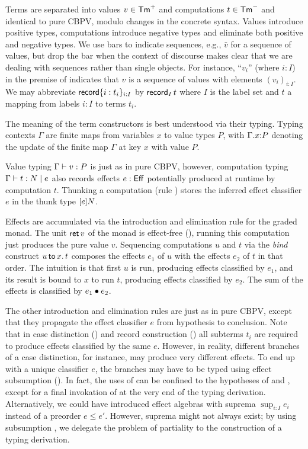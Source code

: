 \documentclass[acmsmall,review,anonymous]{acmart}\settopmatter{printfolios=true,printccs=false,printacmref=false}
\begin{document}
Terms are separated into values $v \in \PTm$ and computations $t \in
\NTm$ and identical to pure CBPV, modulo changes in the concrete
syntax.  Values introduce positive types,
computations introduce
negative types and
eliminate both positive and negative types.
We use bars to indicate sequences, e.g., $\bar v$ for a
sequence of values, but drop the bar when the context of discourse
makes clear that we are dealing with sequences rather than single
objects.  For instance, ``$v_i$'' (where $i : I$) in the premise of
\rintro\otimes indicates that $v$ is a sequence of values with
elements $(v_i)_{i:I}$.  We may abbreviate $\trecord \{i :
t_i\}_{i:I}$ by $\recrd I t$ where $I$ is the label set and $t$ a
mapping from labels $i:I$ to terms $t_i$.

The meaning of the term constructors is best understood via their
typing.  Typing contexts $\Gamma$ are finite maps from variables $x$
to value types $P$, with $\ext \Gamma x P$ denoting the update of the
finite map $\Gamma$ at key $x$ with value $P$.

Value typing $\ValTy \Gamma v P$ is just as in pure CBPV, however,
computation typing $\CompTy \Gamma t e N$ also records effects $e :
\Eff$ potentially produced at runtime by computation $t$.  Thunking a
computation (rule \rintro\Box) stores the inferred effect classifier
$e$ in the thunk type $\thunkty e N$.

Effects are accumulated via the introduction and elimination rule for
the graded monad.  The unit $\ret v$ of the monad is effect-free
(\rintro\diamond), running this computation just produces the pure
value $v$.  Sequencing computations $u$ and $t$ via the \emph{bind}
construct $\bind x u t$ composes the effects $e_1$ of $u$ with the
effects $e_2$ of $t$ in that order.  The intuition is that first $u$
is run, producing effects classified by $e_1$, and its result is bound
to $x$ to run $t$, producing effects classified by $e_2$.  The sum of
the effects is classified by $e_1 \bu e_2$.

The other introduction and elimination rules are just as in pure
CBPV, except that they propagate the effect classifier $e$ from
hypothesis to conclusion.  Note that in case distinction (\relim\GS)
and record construction (\rintro\Pi) all subterms $t_i$ are required
to produce effects classified by the same $e$.  However, in reality,
different branches of a case distinction, for instance, may produce
very different effects.  To end up with a unique classifier $e$, the
branches may have to be typed using effect subsumption (\rsub).  In
fact, the uses of \rsub can be confined to the hypotheses of \relim\GS
and \rintro\Pi, except for a final invokation of \rsub at the very end
of the typing derivation.  Alternatively, we could have introduced
effect algebras with suprema $\sup_{i:I} e_i$ instead of a preorder $e
\leq e'$.  However, suprema might not always exist; by using
subsumption \rsub, we delegate the problem of partiality to the
construction of a typing derivation.
\end{document}
